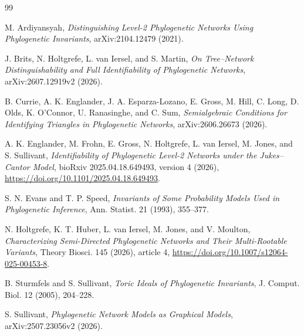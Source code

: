 \documentclass[11pt]{article}
\theoremstyle{remark}
\begin{document}
\begin{thebibliography}{99}

M. Ardiyansyah,
\emph{Distinguishing Level-2 Phylogenetic Networks Using Phylogenetic
Invariants}, arXiv:2104.12479 (2021).

J. Brits, N. Holtgrefe, L. van Iersel, and S. Martin,
\emph{On Tree--Network Distinguishability and Full Identifiability of
Phylogenetic Networks}, arXiv:2607.12919v2 (2026).

B. Currie, A. K. Englander, J. A. Esparza-Lozano, E. Gross, M. Hill,
C. Long, D. Olds, K. O'Connor, U. Ranasinghe, and C. Sum,
\emph{Semialgebraic Conditions for Identifying Triangles in Phylogenetic
Networks}, arXiv:2606.26673 (2026).

A. K. Englander, M. Frohn, E. Gross, N. Holtgrefe, L. van Iersel,
M. Jones, and S. Sullivant,
\emph{Identifiability of Phylogenetic Level-2 Networks under the
Jukes--Cantor Model}, bioRxiv 2025.04.18.649493, version 4 (2026),
\url{https://doi.org/10.1101/2025.04.18.649493}.

S. N. Evans and T. P. Speed,
\emph{Invariants of Some Probability Models Used in Phylogenetic Inference},
Ann. Statist. 21 (1993), 355--377.

N. Holtgrefe, K. T. Huber, L. van Iersel, M. Jones, and V. Moulton,
\emph{Characterizing Semi-Directed Phylogenetic Networks and Their
Multi-Rootable Variants}, Theory Biosci. 145 (2026), article 4,
\url{https://doi.org/10.1007/s12064-025-00453-8}.

B. Sturmfels and S. Sullivant,
\emph{Toric Ideals of Phylogenetic Invariants},
J. Comput. Biol. 12 (2005), 204--228.

S. Sullivant,
\emph{Phylogenetic Network Models as Graphical Models},
arXiv:2507.23056v2 (2026).

\end{thebibliography}
\end{document}
